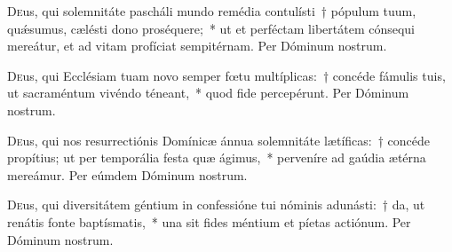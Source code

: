 \documentclass[vesperale_romanum.tex]{subfiles}
\begin{document}





\oratio

\lettrine{D}{e}us, qui solemnitáte pascháli mundo remédia contulísti~† pópulum tuum, quǽsumus, cælésti dono proséquere;~* ut et perféctam libertátem cónsequi mereátur, et ad vitam profíciat sempitérnam. Per Dóminum nostrum.



\oratio

\lettrine{D}{e}us, qui Ecclésiam tuam novo semper fœtu multíplicas:~† concéde fámulis tuis, ut sacraméntum vivéndo téneant,~* quod fide percepérunt.
Per Dóminum nostrum.



\oratio

\lettrine{D}{e}us, qui nos resurrectiónis Domínicæ ánnua solemnitáte lætíficas:~† concéde propítius; ut per temporália festa quæ ágimus,~* perveníre ad gaúdia ætérna mereámur.
Per eúmdem Dóminum nostrum.





\oratio

\lettrine{D}{e}us, qui diversitátem géntium in confessióne tui nóminis adunásti:~† da, ut renátis fonte baptísmatis,~* una sit fides méntium et píetas actiónum.
Per Dóminum nostrum.
\end{document}
